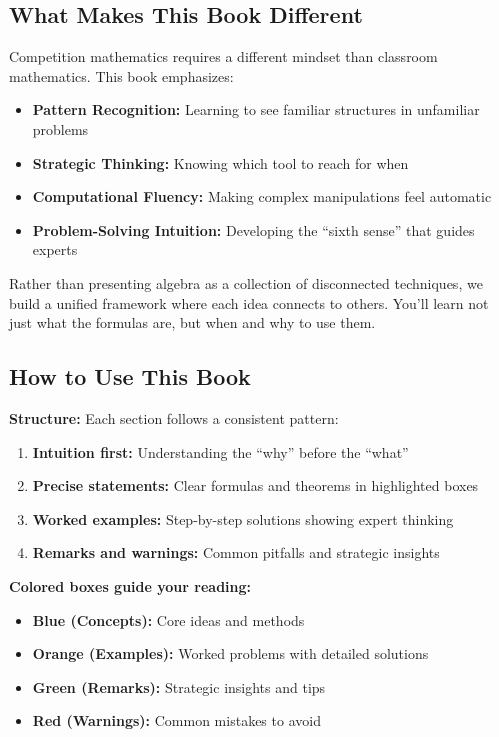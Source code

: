 \documentclass[12pt]{extarticle}
\begin{document}
\subsection*{What Makes This Book Different}

Competition mathematics requires a different mindset than classroom mathematics. This book emphasizes:

\begin{itemize}
    \item \textbf{Pattern Recognition:} Learning to see familiar structures in unfamiliar problems
    \item \textbf{Strategic Thinking:} Knowing which tool to reach for when
    \item \textbf{Computational Fluency:} Making complex manipulations feel automatic
    \item \textbf{Problem-Solving Intuition:} Developing the ``sixth sense'' that guides experts
\end{itemize}

Rather than presenting algebra as a collection of disconnected techniques, we build a unified framework where each idea connects to others. You'll learn not just what the formulas are, but when and why to use them.

\subsection*{How to Use This Book}

\textbf{Structure:} Each section follows a consistent pattern:
\begin{enumerate}
    \item \textbf{Intuition first:} Understanding the ``why'' before the ``what''
    \item \textbf{Precise statements:} Clear formulas and theorems in highlighted boxes
    \item \textbf{Worked examples:} Step-by-step solutions showing expert thinking
    \item \textbf{Remarks and warnings:} Common pitfalls and strategic insights
\end{enumerate}

\textbf{Colored boxes guide your reading:}
\begin{itemize}
    \item \textcolor{blue!75!black}{\textbf{Blue (Concepts):}} Core ideas and methods
    \item \textcolor{orange!75!black}{\textbf{Orange (Examples):}} Worked problems with detailed solutions
    \item \textcolor{green!60!black}{\textbf{Green (Remarks):}} Strategic insights and tips
    \item \textcolor{red!75!black}{\textbf{Red (Warnings):}} Common mistakes to avoid
\end{itemize}
\end{document}

